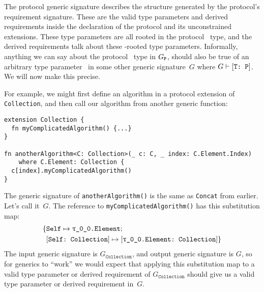 \documentclass[../generics]{subfiles}
\begin{document}
The protocol generic signature describes the structure generated by the protocol's requirement signature. These are the valid type parameters and derived requirements inside the declaration of the protocol and its unconstrained extensions. These type parameters are all rooted in the protocol \tSelf\ type, and the derived requirements talk about these \tSelf-rooted type parameters. Informally, anything we can say about the protocol \tSelf\ type in $G_{\texttt{P}}$, should also be true of an arbitrary type parameter \tT\ in some other generic signature~$G$ where $G\vdash[\texttt{T:~P}]$. We will now make this precise.

For example, we might first define an algorithm in a protocol extension of \texttt{Collection}, and then call our algorithm from another generic function:
\begin{Verbatim}
extension Collection {
  fn myComplicatedAlgorithm() {...}
}

fn anotherAlgorithm<C: Collection>(_ c: C, _ index: C.Element.Index)
    where C.Element: Collection {
  c[index].myComplicatedAlgorithm()
}
\end{Verbatim}
The generic signature of \texttt{anotherAlgorithm()} is the same as \texttt{Concat} from earlier. Let's call it~$G$. The reference to \texttt{myComplicatedAlgorithm()} has this substitution map:
\begin{align*}
\SubstMapC{&\SubstType{Self}{\rT.Element}}{\\
&\SubstConf{Self}{\rT.Element}{Collection}}
\end{align*}
The input generic signature is $G_\texttt{Collection}$, and output generic signature is $G$, so for generics to ``work'' we would expect that applying this substitution map to a valid type parameter or derived requirement of $G_\texttt{Collection}$ should give us a valid type parameter or derived requirement in~$G$.
\end{document}
